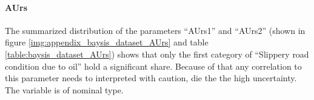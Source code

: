 \documentclass[a4paper,headsepline,footsepline,fontsize=11pt,BCOR=12mm,DIV=12]{report}
\begin{document}
\paragraph{AUrs}
The summarized distribution of the parameters “AUrs1” and “AUrs2” (shown in figure \ref{img:appendix_baysis_dataset_AUrs} and table \ref{table:baysis_dataset_AUrs}) shows that only the first category of “Slippery road condition due to oil” hold a significant share. Because of that any correlation to this parameter needs to interpreted with caution, die the the high uncertainty. The variable is of nominal type. 
\noindent
\begingroup
	\centering
\end{document}
